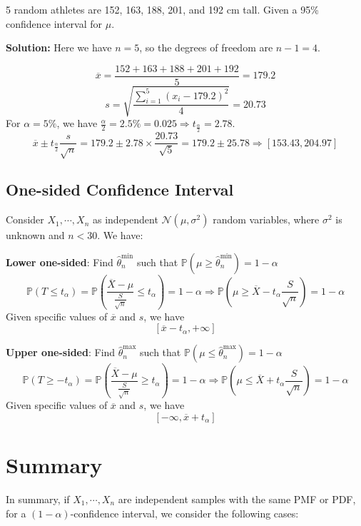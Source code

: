 \begin{eg}
  5 random athletes are 152, 163, 188, 201, and 192 cm tall. Given a 95\% confidence interval for \(\mu\).

  \textbf{Solution:} 
  Here we have \(n = 5\), so the degrees of freedom are \(n - 1 = 4\). 
  
  \[
    \overline{x} = \dfrac{152 + 163 + 188 + 201 + 192}{5} = 179.2
  \]
  \[
    s = \sqrt{\dfrac{\sum_{i = 1}^5 (x_i - 179.2)^2}{4}} = 20.73 
  \]
  For \(\alpha = 5\%\), we have \(\frac{\alpha}{2} = 2.5\% = 0.025 \Rightarrow t_{\frac{\alpha}{2}} = 2.78\). 
  \[
    \overline{x} \pm t_{\frac{\alpha}{2}} \dfrac{s}{\sqrt{n}} = 179.2 \pm 2.78 \times \dfrac{20.73}{\sqrt{5}} = 179.2 \pm 25.78 \Rightarrow [153.43, 204.97]
  \]
\end{eg}

\subsection{One-sided Confidence Interval}
Consider \(X_1, \cdots, X_n\) as independent \(\mathcal{N}(\mu, \sigma^2)\) random variables, where \(\sigma^2\) is unknown and \(n < 30\). We have:

\textbf{Lower one-sided}: Find \(\hat{\theta}_n^{\min}\) such that \(\mathbb{P}(\mu \geq \hat{\theta}_n^{\min}) = 1 - \alpha\)
\[
  \mathbb{P}(T \leq t_{\alpha}) = \mathbb{P} \left(\dfrac{\overline{X} - \mu}{\frac{S}{\sqrt{n}}} \leq t_{\alpha}\right) = 1 - \alpha \Longrightarrow \mathbb{P}\left(\mu \geq \overline{X} - t_{\alpha}\dfrac{S}{\sqrt{n}}\right) = 1 - \alpha
\]
Given specific values of \(\overline{x}\) and \(s\), we have 
\[
  \left[\overline{x} - t_{\alpha}, +\infty\right]
\]

\textbf{Upper one-sided}: Find \(\hat{\theta}_n^{\max}\) such that \(\mathbb{P}(\mu \leq \hat{\theta}_n^{\max}) = 1 - \alpha\)
\[
  \mathbb{P}(T \geq -t_{\alpha}) = \mathbb{P} \left(\dfrac{\overline{X} - \mu}{\frac{S}{\sqrt{n}}} \geq t_{\alpha}\right) = 1 - \alpha \Longrightarrow \mathbb{P}\left(\mu \leq \overline{X} + t_{\alpha}\dfrac{S}{\sqrt{n}}\right) = 1 - \alpha
\]
Given specific values of \(\overline{x}\) and \(s\), we have 
\[
  \left[-\infty, \overline{x} + t_{\alpha}\right]
\]

\section{Summary}
In summary, if \(X_1, \cdots, X_n\) are independent samples with the same PMF or PDF, for a \((1 - \alpha)\)-confidence interval, we consider the following cases:

